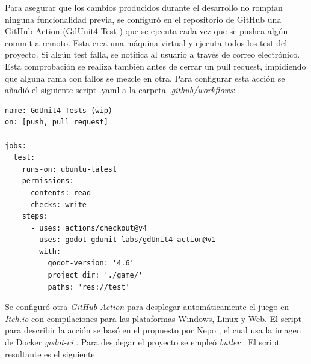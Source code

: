 
Para asegurar que los cambios producidos durante el desarrollo no rompían ninguna funcionalidad previa, se configuró en el repositorio de GitHub una GitHub Action (GdUnit4 Test \cite{gdunit4-action}) que se ejecuta cada vez que se pushea algún commit a remoto. Esta crea una máquina virtual y ejecuta todos los test del proyecto. Si algún test falla, se notifica al usuario a través de correo electrónico. Esta comprobación se realiza también antes de cerrar un pull request, impidiendo que alguna rama con fallos se mezcle en otra. Para configurar esta acción se añadió el siguiente script .yaml a la carpeta \textit{.github/workflows}:

\begin{verbatim}
name: GdUnit4 Tests (wip)
on: [push, pull_request]

jobs:
  test:
    runs-on: ubuntu-latest
    permissions:
      contents: read
      checks: write
    steps:
      - uses: actions/checkout@v4
      - uses: godot-gdunit-labs/gdUnit4-action@v1
        with:
          godot-version: '4.6'
          project_dir: './game/'
          paths: 'res://test'
\end{verbatim}

Se configuró otra \textit{GitHub Action} para desplegar automáticamente el juego en \textit{Itch.io} con compilaciones para las plataformas Windows, Linux y Web. El script para describir la acción se basó en el propuesto por Nepo \cite{nepo-ci}, el cual usa la imagen de Docker \textit{godot-ci} \cite{godot-ci}. Para desplegar el proyecto se empleó \textit{butler} \cite{butler}. El script resultante es el siguiente:

